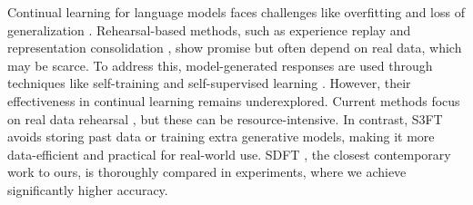 Continual learning for language models faces challenges like overfitting and loss of generalization  \cite{yogatama2019learning,zhang2021revisiting}. Rehearsal-based methods, such as experience replay \cite{rolnick2019experience} and representation consolidation \cite{bhat2022representation}, show promise but often depend on real data, which may be scarce. To address this, model-generated responses are used through techniques like self-training \cite{he2020revisiting,xie2020self} and self-supervised learning \cite{lewis2020bart}. However, their effectiveness in continual learning remains underexplored. Current methods focus on real data rehearsal \cite{scialom2022continual,mok2023large,zhang2023continual}, but these can be resource-intensive. In contrast, S3FT avoids storing past data or training extra generative models, making it more data-efficient and practical for real-world use.
SDFT \cite{yang2024self}, the closest contemporary work to ours, is thoroughly compared in experiments, where we achieve significantly higher accuracy.